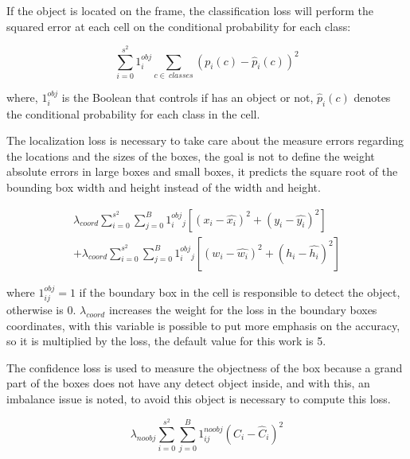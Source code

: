 If the object is located on the frame, the classification loss will perform the squared error at each cell on the conditional probability for each class: 

\begin{equation}
\label{eq:classification_loss}
    \sum_{i=0}^{s^2}1^{obj}_i \sum_{c\in~classes} \left ( p_i\left ( c \right )-\hat{p}_i\left ( c \right )\right )^2
\end{equation}

where, $1^{obj}_i$ is the Boolean that controls if has an object or not, $\hat{p}_i\left ( c \right )$ denotes the conditional probability for each class in the cell.

The localization loss is necessary to take care about the measure errors regarding the locations and the sizes of the boxes, the goal is not to define the weight absolute errors in large boxes and small boxes, it predicts the square root of the bounding box width and height instead of the width and height. 

\begin{equation}
\label{eq:localization_loss}
\begin{aligned}
    \lambda_{coord}\sum_{i=0}^{s^2}\sum_{j=0}^{B}1^{obj}_i_j\left [ \left ( x_i - \hat{x_i} \right )^2  + (y_i-\hat{y_i})^2 \right ] \\ 
    + \lambda_{coord}\sum_{i=0}^{s^2}\sum_{j=0}^{B}1^{obj}_i_j\left [ \left ( w_i - \hat{w_i} \right )^2  + (h_i-\hat{h_i})^2 \right ] 
    \end{aligned}
\end{equation}

where $1_{ij}^{obj} = 1$ if the boundary box in the cell is responsible to detect the object, otherwise is 0. $\lambda_{coord}$ increases the weight for the loss in the boundary boxes coordinates, with this variable is possible to put more emphasis on the accuracy, so it is multiplied by the loss, the default value for this work is 5. 

The confidence loss is used to measure the objectness of the box because a grand part of the boxes does not have any detect object inside, and with this, an imbalance issue is noted, to avoid this object is necessary to compute this loss. 

\begin{equation}
    \label{eq:confidence_loss}
    \lambda_{noobj}\sum_{i=0}^{s^2}\sum_{j=0}^{B}1^{noobj}_{ij}\left ( C_i - \hat{C}_i \right )^2
\end{equation}

